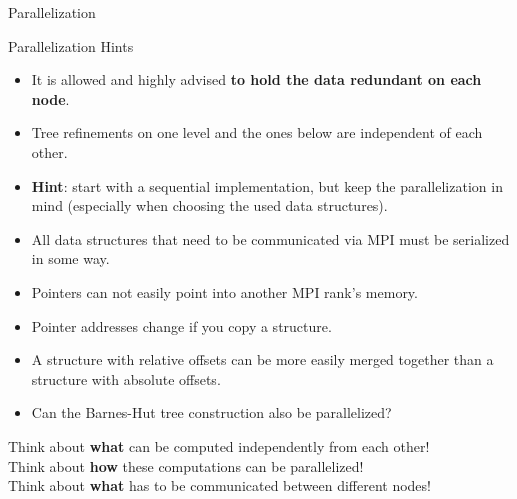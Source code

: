 \begin{frame}{Parallelization}
\begin{flushleft}
    \end{flushleft}
\end{frame}

\begin{frame}[fragile]{Parallelization Hints}
    \begin{itemize}
        \item It is allowed and highly advised \textbf{to hold the data redundant on each node}.
        \item Tree refinements on one level and the ones below are independent of each other.
        \item \textbf{Hint}: start with a sequential implementation, but keep the parallelization in mind (especially when choosing the used data structures).
        \item All data structures that need to be communicated via MPI must be serialized in some way.
        \item Pointers can not easily point into another MPI rank's memory.
        \item Pointer addresses change if you copy a structure.
        \item A structure with relative offsets can be more easily merged together than a structure with absolute offsets.
        \item Can the Barnes-Hut tree construction also be parallelized? 
    \end{itemize}
    \vfill
    \pause
    \DisplayRightArrow Think about \textbf{what} can be computed independently from each other! \\
    \DisplayRightArrow Think about \textbf{how} these computations can be parallelized! \\
    \DisplayRightArrow Think about \textbf{what} has to be communicated between different nodes!
\end{frame}
